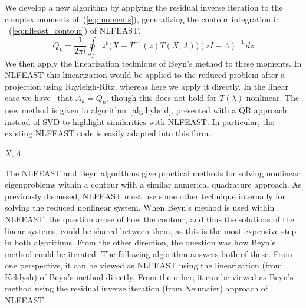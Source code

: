 \documentclass[onefignum,onetabnum]{siamart190516}
\begin{document}
We develop a new algorithm by applying the residual inverse iteration to the complex moments of~(\ref{eq:moments}), generalizing the contour integration in ~(\ref{eq:nlfeast_contour}) of NLFEAST.
\begin{equation}
	Q_k = \frac{1}{2 \pi i} \oint_{\Gamma} z^k \Big(X - T^{-1}(z)T(X, \Lambda) \Big){(zI - \Lambda)}^{-1} \, dz
\end{equation}
We then apply the linearization technique of Beyn's method to these moments.
In NLFEAST this linearization would be applied to the reduced problem after a projection using Rayleigh-Ritz, whereas here we apply it directly.
In the linear case we have~\cite{neumaier1985} that \( A_k = Q_k \), though this does not hold for \( T(\lambda) \) nonlinear.
The new method is given in algorithm~\ref{alg:hybrid}, presented with a QR approach instead of SVD to highlight similarities with NLFEAST.
In particular, the existing NLFEAST code is easily adapted into this form.

\begin{algorithm}
\caption{NLFEAST-Beyn Hybrid Algorithm}
\label{alg:hybrid}
\begin{algorithmic}
	\ENDWHILE
	\RETURN \( X, \Lambda \)
\end{algorithmic}
\end{algorithm}

The NLFEAST and Beyn algorithms give practical methods for solving nonlinear eigenproblems within a contour with a similar numerical quadrature approach.
As previously discussed, NLFEAST must use some other technique internally for solving the reduced nonlinear system.
When Beyn's method is used within NLFEAST, the question arose of how the contour, and thus the solutions of the linear systems, could be shared between them, as this is the most expensive step in both algorithms.
From the other direction, the question was how Beyn's method could be iterated.
The following algorithm answers both of these.
From one perspective, it can be viewed as NLFEAST using the linearization (from Keldysh) of Beyn's method directly.
From the other, it can be viewed as Beyn's method using the residual inverse iteration (from Neumaier) approach of NLFEAST.
\end{document}
